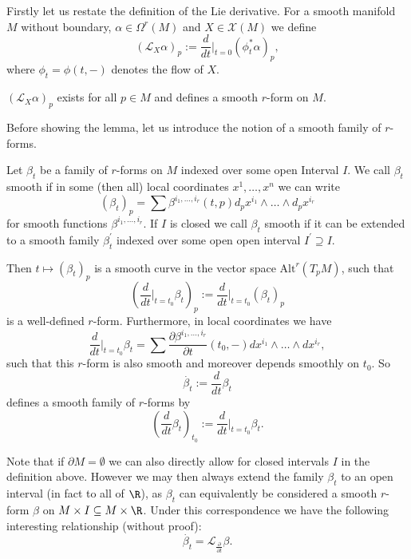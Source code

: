 Firstly let us restate the definition of the Lie derivative. For a smooth manifold $M$ without boundary, $\alpha \in \Omega^r(M)$ and $X \in \mathscr{X}(M)$ we define
\[
(\mathcal{L}_X \alpha)_p := \frac{d}{dt}\bigg|_{t=0} (\phi_t^\ast \alpha)_p,
\]
where $\phi_t = \phi(t,-)$ denotes the flow of $X$.

\begin{lemma}
    \label{lem:well_definedness_Lie_derivative}
    $(\mathcal{L}_X\alpha)_p$ exists for all $p\in M$ and defines a smooth $r$-form on $M$.
\end{lemma}

Before showing the lemma, let us introduce the notion of a smooth family of $r$-forms.

\begin{definition}
    Let $\beta_t$ be a family of $r$-forms on $M$ indexed over some open Interval $I$. We call $\beta_t$ smooth if in some (then all) local coordinates $x^1,\ldots,x^n$ we can write
    \[
    (\beta_t)_p = \sum \beta^{i_1,\ldots,i_r}(t,p)d_px^{i_1} \wedge \ldots \wedge d_px^{i_r}
    \]
    for smooth functions $\beta^{i_1,\ldots,i_r}$. If $I$ is closed we call $\beta_t$ smooth if it can be extended to a smooth family $\beta^\prime_t$ indexed over some open open interval $I^\prime \supseteq I$.
\end{definition}

\noindent Then $t \mapsto (\beta_t)_p$ is a smooth curve in the vector space $\mathrm{Alt}^r(T_pM)$, such that 
\[
\left(\frac{d}{dt}\bigg|_{t=t_0} \beta_t\right)_p := \frac{d}{dt}\bigg|_{t=t_0} (\beta_t)_p
\]
is a well-defined $r$-form. Furthermore, in local coordinates we have
\[
    \frac{d}{dt}\bigg|_{t=t_0} \beta_t = \sum \frac{\partial\beta^{i_1,\ldots,i_r}}{\partial t}(t_0,-)dx^{i_1} \wedge \ldots \wedge dx^{i_r},
\]
such that this $r$-form is also smooth and moreover depends smoothly on $t_0$. So 
\[
\dot{\beta_t} := \frac{d}{dt}\beta_t
\]
defines a smooth family of $r$-forms by
\[
\left(\frac{d}{dt}\beta_t\right)_{t_0} := \frac{d}{dt}\bigg|_{t=t_0} \beta_t.
\]

Note that if $\partial M = \emptyset$ we can also directly allow for closed intervals $I$ in the definition above. However we may then always extend the family $\beta_t$ to an open interval (in fact to all of $\R$), as $\beta_t$ can equivalently be considered a smooth $r$-form $\beta$ on $M \times I \subseteq M \times \R$. Under this correspondence we have the following interesting relationship (without proof):
\[
\dot{\beta_t} = \mathcal{L}_{\frac{\partial}{\partial t}}\beta.
\]


